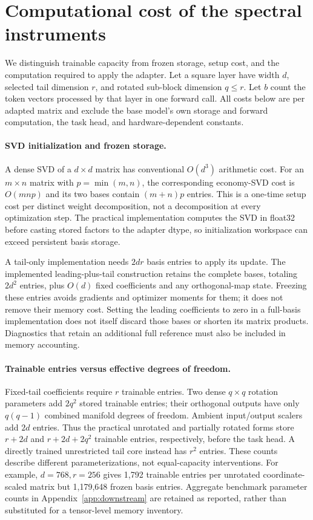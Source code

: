 \section{Computational cost of the spectral instruments}
\label{app:cost}
We distinguish trainable capacity from frozen storage, setup cost, and the computation required to apply the adapter. Let a square layer have width $d$, selected tail dimension $r$, and rotated sub-block dimension $q\le r$. Let $b$ count the token vectors processed by that layer in one forward call. All costs below are per adapted matrix and exclude the base model's own storage and forward computation, the task head, and hardware-dependent constants.

\paragraph{SVD initialization and frozen storage.}
A dense SVD of a $d\times d$ matrix has conventional $O(d^3)$ arithmetic cost. For an $m\times n$ matrix with $p=\min(m,n)$, the corresponding economy-SVD cost is $O(mnp)$ and its two bases contain $(m+n)p$ entries. This is a one-time setup cost per distinct weight decomposition, not a decomposition at every optimization step. The practical implementation computes the SVD in float32 before casting stored factors to the adapter dtype, so initialization workspace can exceed persistent basis storage.

A tail-only implementation needs $2dr$ basis entries to apply its update. The implemented leading-plus-tail construction retains the complete bases, totaling $2d^2$ entries, plus $O(d)$ fixed coefficients and any orthogonal-map state. Freezing these entries avoids gradients and optimizer moments for them; it does not remove their memory cost. Setting the leading coefficients to zero in a full-basis implementation does not itself discard those bases or shorten its matrix products. Diagnostics that retain an additional full reference must also be included in memory accounting.

\paragraph{Trainable entries versus effective degrees of freedom.}
Fixed-tail coefficients require $r$ trainable entries. Two dense $q\times q$ rotation parameters add $2q^2$ stored trainable entries; their orthogonal outputs have only $q(q-1)$ combined manifold degrees of freedom. Ambient input/output scalers add $2d$ entries. Thus the practical unrotated and partially rotated forms store $r+2d$ and $r+2d+2q^2$ trainable entries, respectively, before the task head. A directly trained unrestricted tail core instead has $r^2$ entries. These counts describe different parameterizations, not equal-capacity interventions. For example, $d=768,r=256$ gives 1,792 trainable entries per unrotated coordinate-scaled matrix but 1,179,648 frozen basis entries. Aggregate benchmark parameter counts in Appendix~\ref{app:downstream} are retained as reported, rather than substituted for a tensor-level memory inventory.

